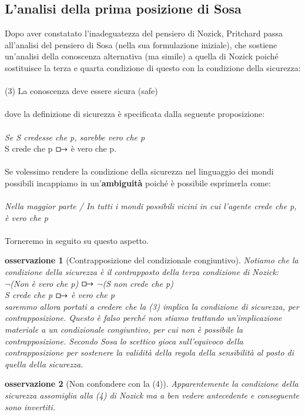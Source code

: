 \documentclass[10pt,a4paper]{article}
\newtheorem{osservazione}{osservazione}
\begin{document}
\subsection{L'analisi della prima posizione di Sosa}
Dopo aver constatato l'inadeguatezza del pensiero di Nozick, Pritchard passa all'analisi del pensiero di Sosa (nella sua formulazione iniziale), che sostiene un'analisi della conoscenza alternativa (ma simile) a quella di Nozick poiché sostituisce la terza e quarta condizione di questo con la condizione della sicurezza: \\\\
(3) La conoscenza deve essere sicura (safe)\\\\
dove la definizione di sicurezza è specificata dalla seguente proposizione:\\\\
\textit{Se S credesse che p, sarebbe vero che p}\\
S crede che p $\boxright$ è vero che p.\\\\
Se volessimo rendere la condizione della sicurezza nel linguaggio dei mondi possibili incappiamo in un'\textbf{ambiguità} poiché è possibile esprimerla come:\\\\
\textit{Nella maggior parte / In tutti i mondi possibili vicini in cui l'agente crede che p, è vero che p}\\\\
Torneremo in seguito su questo aspetto.
\begin{osservazione}[Contrapposizione del condizionale congiuntivo]
	Notiamo che la condizione della sicurezza è il contrapposto della terza condizione di Nozick:\\
	$\neg$(Non è vero che p) $\boxright$ $\neg$(S non crede che p)\\
	S crede che p $\boxright$ è vero che p\\
	saremmo allora portati a credere che la (3) implica la condizione di sicurezza, per contrapposizione. Questo è falso perché non stiamo trattando un'implicazione materiale a un condizionale congiuntivo, per cui non è possibile la contrapposizione. Secondo Sosa lo scettico gioca sull'equivoco della contrapposizione per sostenere la validità della regola della sensibilità al posto di quella della sicurezza.
\end{osservazione}
\begin{osservazione}[Non confondere con la (4)]
	Apparentemente la condizione della sicurezza assomiglia alla (4) di Nozick ma a ben vedere antecedente e conseguente sono invertiti. 
\end{osservazione}
\end{document}
